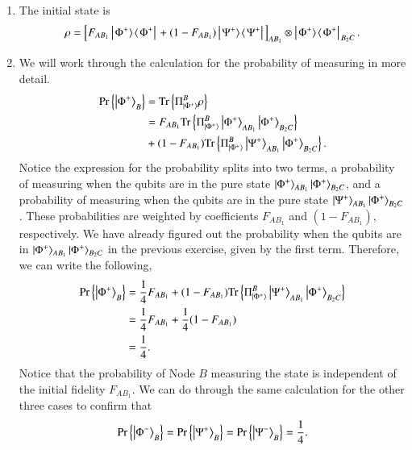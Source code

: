 \begin{solution}
\begin{enumerate}[label=(\alph*)]
    \item The initial state is
    \begin{equation*}
        \rho = \left[ F_{AB_1}\left|\left. \Phi^+ \rangle\right.\!\langle\left. \Phi^+ \right|\right.  + (1-F_{AB_1})\left|\left. \Psi^+ \rangle\right.\!\langle\left. \Psi^+ \right|\right.  \right]_{AB_1} \otimes \left|\left. \Phi^+ \rangle\right.\!\langle\left. \Phi^+ \right|\right. _{B_2C}.
    \end{equation*}
    \item We will work through the calculation for the probability of measuring \ket{\Phi^+} in more detail.
    \begin{align*}
        \text{Pr}\left\{ \left| \Phi^+ \right\rangle_B \right\} & = \text{Tr}\left\{ \Pi^B_{\left| \Phi^+ \right\rangle} \rho \right\} \\
        & = F_{AB_1} \text{Tr}\left\{ \Pi^B_{\left| \Phi^+ \right\rangle} \left| \Phi^+ \right\rangle_{AB_1}\left| \Phi^+ \right\rangle_{B_2C} \right\} \\
        & + (1-F_{AB_1}) \text{Tr}\left\{ \Pi^B_{\left| \Phi^+ \right\rangle} \left| \Psi^+ \right\rangle_{AB_1}\left| \Phi^+ \right\rangle_{B_2C} \right\}.
    \end{align*}
    Notice the expression for the probability splits into two terms, a probability of measuring \ket{\Phi^+} when the qubits are in the pure state $\left| \Phi^+ \right\rangle_{AB_1}\left| \Phi^+ \right\rangle_{B_2C}$, and a probability of measuring \ket{\Phi^+} when the qubits are in the pure state $\left| \Psi^+ \right\rangle_{AB_1}\left| \Phi^+ \right\rangle_{B_2C}$. These probabilities are weighted by coefficients $F_{AB_1}$ and $(1-F_{AB_1})$, respectively. We have already figured out the probability when the qubits are in $\left| \Phi^+ \right\rangle_{AB_1}\left| \Phi^+ \right\rangle_{B_2C}$ in the previous exercise, given by the first term. Therefore, we can write the following,
    \begin{align*}
        \text{Pr}\left\{ \left| \Phi^+ \right\rangle_B \right\} & = \frac{1}{4}F_{AB_1} + (1-F_{AB_1}) \text{Tr}\left\{ \Pi^B_{\left| \Phi^+ \right\rangle} \left| \Psi^+ \right\rangle_{AB_1}\left| \Phi^+ \right\rangle_{B_2C} \right\} \\
        & = \frac{1}{4}F_{AB_1} + \frac{1}{4}(1-F_{AB_1}) \\
        & = \frac{1}{4}.
    \end{align*}
    Notice that the probability of Node $B$ measuring the state \ket{\Phi^+} is independent of the initial fidelity $F_{AB_1}$. We can do through the same calculation for the other three cases to confirm that
    \begin{equation*}
        \text{Pr}\left\{ \ket{\Phi^-}_B \right\} = \text{Pr}\left\{ \ket{\Psi^+}_B \right\} = \text{Pr}\left\{ \ket{\Psi^-}_B \right\} = \frac{1}{4}.

\end{equation*}
\end{enumerate}
\end{solution}
